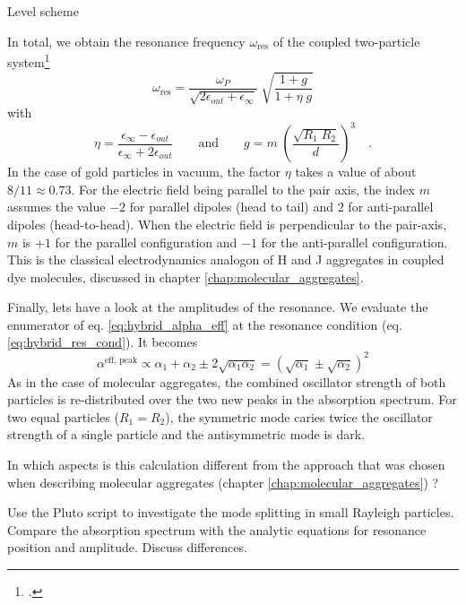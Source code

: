 \begin{marginfigure}
\caption{Level scheme}
\end{marginfigure}

In total, we obtain the resonance
frequency $\omega_{\text{res}} $ of the coupled two-particle system\footcite{Myroshnychenko08} 
%
\begin{equation}  \label{eq:hybrid_omega_coupled}
 \omega_{\text{res}} = \frac{\omega_P}{\sqrt{2 \epsilon_{out} + \epsilon_{\infty}} }  \; \sqrt{
\frac{1 + g}{ 1 +  \eta \; g}}
\end{equation}
%
with 
%
\begin{equation} \label{eq:hybrid_omega_coupled_variables}
 \eta = \frac{\epsilon_{\infty} - \epsilon_{out} }{\epsilon_{\infty} + 2 \epsilon_{out}  } 
 \qquad \text{and} \qquad
    g = m \;  \left( \frac{\sqrt{R_1 \; R_2 } } { d }  \right)^3 \quad .
\end{equation}
%
In the case of gold particles in vacuum, the factor $\eta$ takes a value of about $8/11 \approx 0.73$.
For the electric field being parallel to the pair axis, the index $m$ assumes
the value $-2$ for parallel dipoles (head to tail) and $2$ for anti-parallel
dipoles (head-to-head). When the electric field is perpendicular to the
pair-axis, $m$ is $+1$ for the parallel configuration and $-1$ for the
anti-parallel configuration. This is the classical electrodynamics analogon  of H and J aggregates in coupled dye molecules, discussed in chapter \ref{chap:molecular_aggregates}.



Finally, lets have a look at the amplitudes of the resonance. We evaluate the enumerator of eq.  \ref{eq:hybrid_alpha_eff}
 at the resonance condition (eq. \ref{eq:hybrid_res_cond}). It becomes
 \begin{equation}
 \alpha^\text{eff, peak} \propto \alpha_1  + \alpha_2  \pm 2 \sqrt{\alpha_1 \alpha_2} = \left( \sqrt{\alpha_1}  \pm \sqrt{\alpha_2} \right)^2
\end{equation}
As in the case of molecular aggregates, the combined oscillator strength of both particles is re-distributed over the two new peaks in the absorption spectrum. For two equal particles ($R_1 = R_2$), the symmetric mode caries twice the
oscillator strength of a single  particle and the antisymmetric mode
is dark. 

\begin{questions}
\item In which aspects is this calculation different from the approach that was chosen when describing molecular aggregates (chapter \ref{chap:molecular_aggregates}) ?

\item Use the Pluto script to investigate the mode splitting in small Rayleigh particles. Compare the absorption spectrum with the analytic equations for resonance position and amplitude. Discuss differences.
\end{questions}



